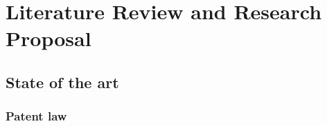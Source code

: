 \chapter{Literature Review and Research Proposal}
\label{chap:literature-review-and-research-proposal}

\lipsum[1]

\section{State of the art}

\lipsum[1]

\subsection{Patent law}

\lipsum[1]